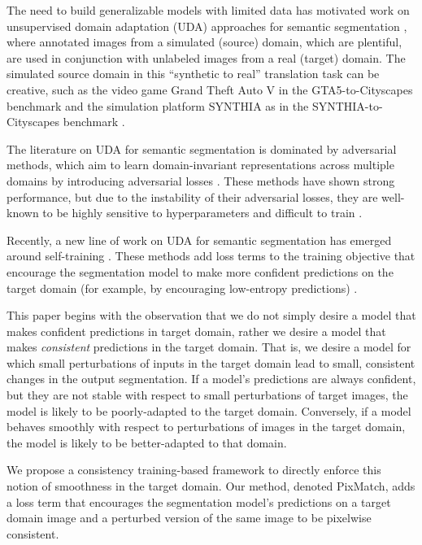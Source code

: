 \documentclass[final]{cvpr}
\begin{document}
The need to build generalizable models with limited data has motivated work on unsupervised domain adaptation (UDA) approaches for semantic segmentation \cite{cbst,adaptsegnet,advent,maxsquare,cycada,chen2018road}, where annotated images from a simulated (source) domain, which are plentiful, are used in conjunction with unlabeled images from a real (target) domain. The simulated source domain in this ``synthetic to real'' translation task can be creative, such as the video game Grand Theft Auto V in the GTA5-to-Cityscapes benchmark \cite{gta} and the simulation platform SYNTHIA as in the SYNTHIA-to-Cityscapes benchmark \cite{synthia}. 

The literature on UDA for semantic segmentation is dominated by adversarial methods, which aim to learn domain-invariant representations across multiple domains by introducing adversarial losses \cite{cycada}. These methods have shown strong performance, but due to the instability of their adversarial losses, they are well-known to be highly sensitive to hyperparameters and difficult to train \cite{gans_hard_one,gans_hard_two,wgan}. 

Recently, a new line of work on UDA for semantic segmentation has emerged around self-training \cite{cbst,advent,maxsquare}. These methods add loss terms to the training objective that encourage the segmentation model to make more confident predictions on the target domain (for example, by encouraging low-entropy predictions) \cite{advent,maxsquare,cbst}. 

This paper begins with the observation that we do not simply desire a model that makes confident predictions in target domain, rather we desire a model that makes \textit{consistent} predictions in the target domain. That is, we desire a model for which small perturbations of inputs in the target domain lead to small, consistent changes in the output segmentation. If a model's predictions are always confident, but they are not stable with respect to small perturbations of target images, the model is likely to be poorly-adapted to the target domain. Conversely, if a model behaves smoothly with respect to perturbations of images in the target domain, the model is likely to be better-adapted to that domain. 

We propose a consistency training-based framework to directly enforce this notion of smoothness in the target domain. Our method, denoted PixMatch, adds a loss term that encourages the segmentation model's predictions on a target domain image and a perturbed version of the same image to be pixelwise consistent. 
\end{document}
